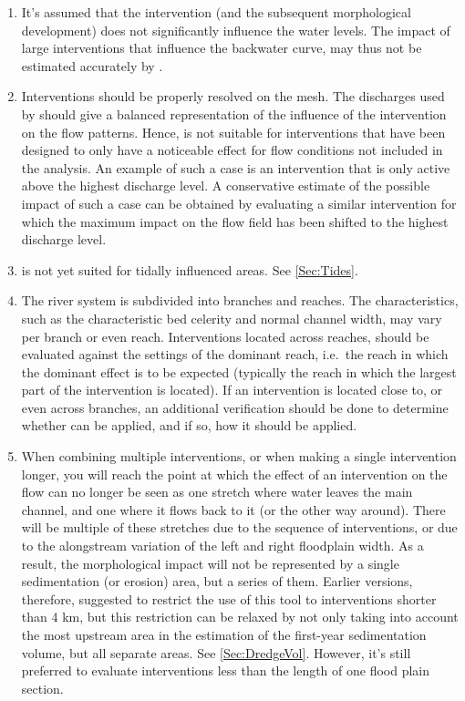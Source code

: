 \begin{enumerate}
\item It's assumed that the intervention (and the subsequent morphological development) does not significantly influence the water levels.
The impact of large interventions that influence the backwater curve, may thus not be estimated accurately by \dfmi.

\item Interventions should be properly resolved on the \dflowfm mesh.
The discharges used by \dfmi should give a balanced representation of the influence of the intervention on the flow patterns.
Hence, \dfmi is not suitable for interventions that have been designed to only have a noticeable effect for flow conditions not included in the analysis.
An example of such a case is an intervention that is only active above the highest discharge level.
A conservative estimate of the possible impact of such a case can be obtained by evaluating a similar intervention for which the maximum impact on the flow field has been shifted to the highest discharge level.

\item \dfastmi is not yet suited for tidally influenced areas.
See \autoref{Sec:Tides}.

\item \label{reach_bnd} The river system is subdivided into branches and reaches.
The characteristics, such as the characteristic bed celerity and normal channel width, may vary per branch or even reach.
Interventions located across reaches, should be evaluated against the settings of the dominant reach, i.e.~the reach in which the dominant effect is to be expected (typically the reach in which the largest part of the intervention is located).
If an intervention is located close to, or even across branches, an additional verification should be done to determine whether \dfmi can be applied, and if so, how it should be applied.

\item When combining multiple interventions, or when making a single intervention longer, you will reach the point at which the effect of an intervention on the flow can no longer be seen as one stretch where water leaves the main channel, and one where it flows back to it (or the other way around).
There will be multiple of these stretches due to the sequence of interventions, or due to the alongstream variation of the left and right floodplain width.
As a result, the morphological impact will not be represented by a single sedimentation (or erosion) area, but a series of them.
Earlier versions, therefore, suggested to restrict the use of this tool to interventions shorter than 4 km, but this restriction can be relaxed by not only taking into account the most upstream area in the estimation of the first-year sedimentation volume, but all separate areas.
See \autoref{Sec:DredgeVol}.
However, it's still preferred to evaluate interventions less than the length of one flood plain section.


\end{enumerate}
